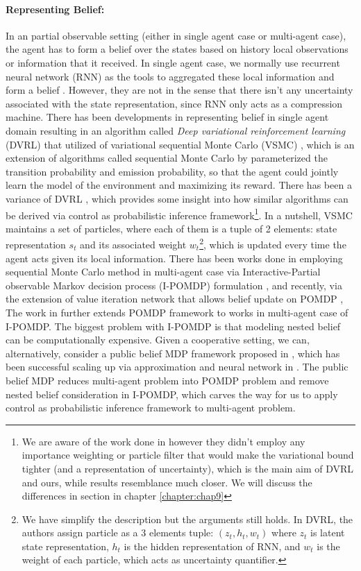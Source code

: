 \paragraph{Representing Belief:} In an partial observable setting (either in single agent case or multi-agent case), the agent has to form a belief over the states based on history local observations or information that it received. In single agent case, we normally use recurrent neural network (RNN) as the tools to aggregated these local information and form a belief . However, they are not  in the sense that there isn't any uncertainty associated with the state representation, since RNN only acts as a compression machine. There has been developments in representing belief in single agent domain resulting in an algorithm called \textit{Deep variational reinforcement learning} (DVRL) \cite{igl2018deep} that utilized of variational sequential Monte Carlo (VSMC) \cite{le2017auto, maddison2017filtering, naesseth2017variational}, which is an extension of algorithms called sequential Monte Carlo \cite{doucet2001introduction} by parameterized the transition probability and emission probability, so that the agent could jointly learn the model of the environment and maximizing its reward. There has been a variance of DVRL \cite{shvechikovjoint}, which provides some insight into how similar algorithms can be derived via control as probabilistic inference framework\footnote{We are aware of the work done in \cite{huangsvqn} however they didn't employ any importance weighting or particle filter that would make the variational bound tighter (and a representation of uncertainty), which is the main aim of DVRL and ours, while \cite{shvechikovjoint} results resemblance \cite{igl2018deep} much closer. We will discuss the differences in section in chapter \ref{chapter:chap9}}. In a nutshell, VSMC maintains a set of particles, where each of them is a tuple of 2 elements: state representation $s_t$ and its associated weight $w_t$\footnote{We have simplify the description but the arguments still holds. In DVRL, the authors assign particle as a 3 elements tuple: $(z_t, h_t, w_t)$ where $z_t$ is latent state representation, $h_t$ is the hidden representation of RNN, and $w_t$ is the weight of each particle, which acts as uncertainty quantifier.}, which is updated every time the agent acts given its local information. There has been works done in employing sequential Monte Carlo method in multi-agent case \cite{doshi2009monte} via Interactive-Partial observable Markov decision process (I-POMDP) formulation \cite{gmytrasiewicz2005framework}, and recently, via the extension of value iteration network \cite{tamar2016value} that allows belief update on POMDP \cite{karkus2017qmdp}, The work in \cite{han2019ipomdp} further extends POMDP framework to works in multi-agent case of I-POMDP. The biggest problem with I-POMDP is that modeling nested belief can be computationally expensive. Given a cooperative setting, we can, alternatively, consider a public belief MDP framework proposed in \cite{nayyar2013decentralized}, which has been successful scaling up via approximation and neural network in \cite{foerster2018bayesian, hu2019simplified}. The public belief MDP reduces multi-agent problem into POMDP problem and remove nested belief consideration in I-POMDP, which carves the way for us to apply control as probabilistic inference framework to multi-agent problem. 



